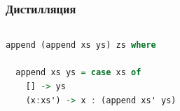 \documentclass[xcolor=table,aspectratio=169]{beamer}
\begin{document}
\begin{frame}[fragile] \frametitle{Дистилляция}


\begin{columns}
    \begin{column}{6cm}
\begin{lstlisting}[language=Haskell]
append (append xs ys) zs where

  append xs ys = case xs of
    [] -> ys
    (x:xs') -> x : (append xs' ys)
\end{lstlisting}
    \end{column}
    \hfill
    
\begin{column}{4cm}


\end{column}
\end{columns}
\end{frame}
\end{document}
